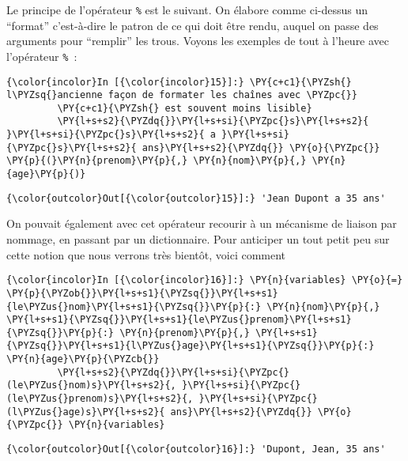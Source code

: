     Le principe de l'opérateur \texttt{\%} est le suivant. On élabore comme
ci-dessus un ``format'' c'est-à-dire le patron de ce qui doit être
rendu, auquel on passe des arguments pour ``remplir'' les trous. Voyons
les exemples de tout à l'heure avec l'opérateur \texttt{\%}~:

    \begin{Verbatim}[commandchars=\\\{\},frame=single,framerule=0.3mm,rulecolor=\color{cellframecolor}]
{\color{incolor}In [{\color{incolor}15}]:} \PY{c+c1}{\PYZsh{} l\PYZsq{}ancienne façon de formater les chaînes avec \PYZpc{}}
         \PY{c+c1}{\PYZsh{} est souvent moins lisible}
         \PY{l+s+s2}{\PYZdq{}}\PY{l+s+si}{\PYZpc{}s}\PY{l+s+s2}{ }\PY{l+s+si}{\PYZpc{}s}\PY{l+s+s2}{ a }\PY{l+s+si}{\PYZpc{}s}\PY{l+s+s2}{ ans}\PY{l+s+s2}{\PYZdq{}} \PY{o}{\PYZpc{}} \PY{p}{(}\PY{n}{prenom}\PY{p}{,} \PY{n}{nom}\PY{p}{,} \PY{n}{age}\PY{p}{)}
\end{Verbatim}


\begin{Verbatim}[commandchars=\\\{\},frame=single,framerule=0.3mm,rulecolor=\color{cellframecolor}]
{\color{outcolor}Out[{\color{outcolor}15}]:} 'Jean Dupont a 35 ans'
\end{Verbatim}
            
    On pouvait également avec cet opérateur recourir à un mécanisme de
liaison par nommage, en passant par un dictionnaire. Pour anticiper un
tout petit peu sur cette notion que nous verrons très bientôt, voici
comment

    \begin{Verbatim}[commandchars=\\\{\},frame=single,framerule=0.3mm,rulecolor=\color{cellframecolor}]
{\color{incolor}In [{\color{incolor}16}]:} \PY{n}{variables} \PY{o}{=} \PY{p}{\PYZob{}}\PY{l+s+s1}{\PYZsq{}}\PY{l+s+s1}{le\PYZus{}nom}\PY{l+s+s1}{\PYZsq{}}\PY{p}{:} \PY{n}{nom}\PY{p}{,} \PY{l+s+s1}{\PYZsq{}}\PY{l+s+s1}{le\PYZus{}prenom}\PY{l+s+s1}{\PYZsq{}}\PY{p}{:} \PY{n}{prenom}\PY{p}{,} \PY{l+s+s1}{\PYZsq{}}\PY{l+s+s1}{l\PYZus{}age}\PY{l+s+s1}{\PYZsq{}}\PY{p}{:} \PY{n}{age}\PY{p}{\PYZcb{}}
         \PY{l+s+s2}{\PYZdq{}}\PY{l+s+si}{\PYZpc{}(le\PYZus{}nom)s}\PY{l+s+s2}{, }\PY{l+s+si}{\PYZpc{}(le\PYZus{}prenom)s}\PY{l+s+s2}{, }\PY{l+s+si}{\PYZpc{}(l\PYZus{}age)s}\PY{l+s+s2}{ ans}\PY{l+s+s2}{\PYZdq{}} \PY{o}{\PYZpc{}} \PY{n}{variables}
\end{Verbatim}


\begin{Verbatim}[commandchars=\\\{\},frame=single,framerule=0.3mm,rulecolor=\color{cellframecolor}]
{\color{outcolor}Out[{\color{outcolor}16}]:} 'Dupont, Jean, 35 ans'
\end{Verbatim}
            
